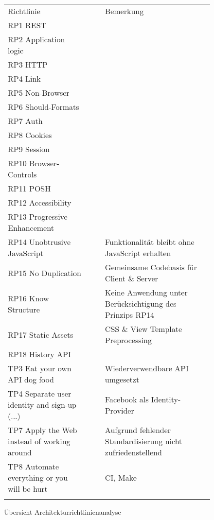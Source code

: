 \begin{figure}[H]
	\begin{table}[H]
		\tablestyle
		\tablealtcolored
		\begin{tabularx}{\textwidth}{l c c X}
			\tableheadcolor
				\tablehead Richtlinie &
				\tablehead\rotatebox{90}{Demonstriert\hspace{3mm}} &
				\tablehead\rotatebox{90}{Resultat} &
				\tablehead Bemerkung
				\tabularnewline
			\tablebody
				RP1	REST & \faOk & \faSmile & \tabularnewline
				RP2 Application logic & & & \tabularnewline
				RP3 HTTP & \faOk & \faSmile & \tabularnewline
				RP4 Link & \faOk & \faSmile & \tabularnewline
				RP5 Non-Browser & \faOk & \faSmile & \tabularnewline
				RP6 Should-Formats & \faOk & \faSmile & \tabularnewline
				RP7 Auth & & & \tabularnewline
				RP8 Cookies & & & \tabularnewline
				RP9 Session & & & \tabularnewline
				RP10 Browser-Controls & \faOk & \faSmile & \tabularnewline
				RP11 POSH & & & \tabularnewline
				RP12 Accessibility & & & \tabularnewline
				RP13 Progressive Enhancement & & & \tabularnewline
				RP14 Unobtrusive JavaScript & \faOk & \faSmile & Funktionalität bleibt ohne JavaScript erhalten\tabularnewline
				RP15 No Duplication & & & Gemeinsame Codebasis für Client \& Server\tabularnewline
				RP16 Know Structure & \faExclamation & \faFrown & Keine Anwendung unter Berücksichtigung des Prinzips RP14 \tabularnewline
				RP17 Static Assets & \faOk & \faSmile & CSS \& View Template Preprocessing\tabularnewline
				RP18 History API & \faOk & \faSmile & \tabularnewline
				TP3 Eat your own API dog food & \faOk & \faSmile & Wiederverwendbare API umgesetzt\tabularnewline
				TP4 Separate user identity and sign-up (...) & \faOk & \faSmile & Facebook als Identity-Provider\tabularnewline
				TP7 Apply the Web instead of working around & \faOk & \faMeh & Aufgrund fehlender Standardisierung nicht zufriedenstellend\tabularnewline
				TP8 Automate everything or you will be hurt & \faOk & \faSmile & \gls{CI}, Make\tabularnewline
			\tableend
		\end{tabularx}
	\end{table}
	\caption{Übersicht Architekturrichtlinienanalyse}
	\label{tab:overview-principle-demonstration}
\end{figure}



\newpage

